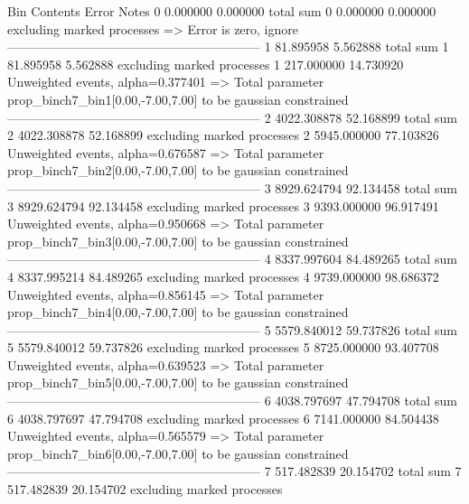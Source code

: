 Bin        Contents        Error           Notes                         
0          0.000000        0.000000        total sum                     
0          0.000000        0.000000        excluding marked processes    
  => Error is zero, ignore      
------------------------------------------------------------
1          81.895958       5.562888        total sum                     
1          81.895958       5.562888        excluding marked processes    
1          217.000000      14.730920       Unweighted events, alpha=0.377401
  => Total parameter prop_binch7_bin1[0.00,-7.00,7.00] to be gaussian constrained
------------------------------------------------------------
2          4022.308878     52.168899       total sum                     
2          4022.308878     52.168899       excluding marked processes    
2          5945.000000     77.103826       Unweighted events, alpha=0.676587
  => Total parameter prop_binch7_bin2[0.00,-7.00,7.00] to be gaussian constrained
------------------------------------------------------------
3          8929.624794     92.134458       total sum                     
3          8929.624794     92.134458       excluding marked processes    
3          9393.000000     96.917491       Unweighted events, alpha=0.950668
  => Total parameter prop_binch7_bin3[0.00,-7.00,7.00] to be gaussian constrained
------------------------------------------------------------
4          8337.997604     84.489265       total sum                     
4          8337.995214     84.489265       excluding marked processes    
4          9739.000000     98.686372       Unweighted events, alpha=0.856145
  => Total parameter prop_binch7_bin4[0.00,-7.00,7.00] to be gaussian constrained
------------------------------------------------------------
5          5579.840012     59.737826       total sum                     
5          5579.840012     59.737826       excluding marked processes    
5          8725.000000     93.407708       Unweighted events, alpha=0.639523
  => Total parameter prop_binch7_bin5[0.00,-7.00,7.00] to be gaussian constrained
------------------------------------------------------------
6          4038.797697     47.794708       total sum                     
6          4038.797697     47.794708       excluding marked processes    
6          7141.000000     84.504438       Unweighted events, alpha=0.565579
  => Total parameter prop_binch7_bin6[0.00,-7.00,7.00] to be gaussian constrained
------------------------------------------------------------
7          517.482839      20.154702       total sum                     
7          517.482839      20.154702       excluding marked processes    
